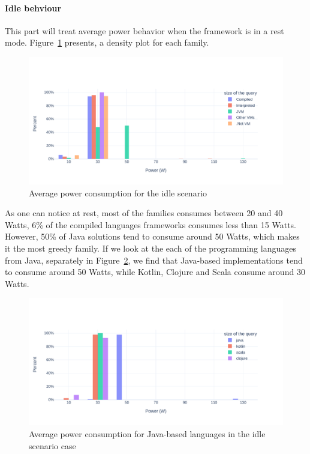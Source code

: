 \paragraph{Idle behviour}
This part will treat average power behavior when the framework is in a rest mode.
Figure~\ref{fig:av_power_idle} presents, a density plot for each family.

\begin{figure}[bht]
    \centering
    \includegraphics[width=1.0\columnwidth]{imgs/av_power_idle}
    \caption{Average power consumption for the idle scenario}
    \label{fig:av_power_idle}
\end{figure}

As one can notice at rest, most of the families consumes between 20 and 40 Watts, 6\% of the compiled languages frameworks consumes less than 15 Watts.
However, 50\% of Java solutions tend to consume around 50 Watts, which makes it the most greedy family.
If we look at the each of the programming languages from Java, separately in Figure~\ref{fig:av_power_java_idle}, we find that Java-based implementations tend to consume around 50 Watts, while Kotlin, Clojure and Scala consume around 30 Watts.

\begin{figure}[bht]
    \centering
    \includegraphics[width=1.0\columnwidth]{imgs/av_power_java_idle}
    \caption{Average power consumption for Java-based languages in the idle scenario case}
    \label{fig:av_power_java_idle}
\end{figure}

